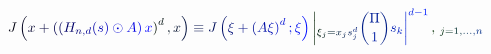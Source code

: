 \documentclass[12pt]{article}
\begin{document}
\makeatletter
\renewcommand*{\@textcolor}[3]{%
  \protect\leavevmode
  \begingroup
    \color#1{#2}#3%
  \endgroup
}
\makeatother
\begin{displaymath}
\mathcolor[RGB]{0,0,15}{J} \mathcolor[RGB]{0,0,30}{\left(} \mathcolor[RGB]{0,0,45}{x} \mathcolor[RGB]{0,0,60}{+} \mathcolor[RGB]{0,0,75}{\left(} \mathcolor[RGB]{0,0,90}{\left(} \mathcolor[RGB]{0,0,105}{H} _ { \mathcolor[RGB]{0,0,120}{n} \mathcolor[RGB]{0,0,135}{,} \mathcolor[RGB]{0,0,150}{d} } \mathcolor[RGB]{0,0,165}{(} \mathcolor[RGB]{0,0,180}{s} \mathcolor[RGB]{0,0,195}{)} \mathcolor[RGB]{0,0,210}{\odot} \mathcolor[RGB]{0,0,225}{A} \mathcolor[RGB]{0,0,240}{\right)} \mathcolor[RGB]{0,0,255}{x} \mathcolor[RGB]{0,15,0}{\right)} ^ { \mathcolor[RGB]{0,15,15}{d} } \mathcolor[RGB]{0,15,30}{,} \mathcolor[RGB]{0,15,45}{x} \mathcolor[RGB]{0,15,60}{\right)} \mathcolor[RGB]{0,15,75}{\equiv} \mathcolor[RGB]{0,15,90}{J} \mathcolor[RGB]{0,15,105}{\left(} \mathcolor[RGB]{0,15,120}{\xi} \mathcolor[RGB]{0,15,135}{+} \mathcolor[RGB]{0,15,150}{\left(} \mathcolor[RGB]{0,15,165}{A} \mathcolor[RGB]{0,15,180}{\xi} \mathcolor[RGB]{0,15,195}{\right)} ^ { \mathcolor[RGB]{0,15,210}{d} } \mathcolor[RGB]{0,15,225}{;} \mathcolor[RGB]{0,15,240}{\xi} \mathcolor[RGB]{0,15,255}{\right)} \mathcolor[RGB]{0,30,0}{\left\vert} _ { \mathcolor[RGB]{0,30,15}{\xi} _ { \mathcolor[RGB]{0,30,30}{j} } \mathcolor[RGB]{0,30,45}{=} \mathcolor[RGB]{0,30,60}{x} _ { \mathcolor[RGB]{0,30,75}{j} } \mathcolor[RGB]{0,30,90}{s} _ { \mathcolor[RGB]{0,30,105}{j} } ^ { \mathcolor[RGB]{0,30,120}{d} } } \mathcolor[RGB]{0,30,135}{\binom { \mathcolor[RGB]{0,30,150}{\Pi} } { \mathcolor[RGB]{0,30,165}{1} } } \mathcolor[RGB]{0,30,180}{s} _ { \mathcolor[RGB]{0,30,195}{k} } \mathcolor[RGB]{0,30,210}{\right\vert} ^ { \mathcolor[RGB]{0,30,225}{d} \mathcolor[RGB]{0,30,240}{-} \mathcolor[RGB]{0,30,255}{1} } \mathcolor[RGB]{0,45,0}{,} \, _ { \mathcolor[RGB]{0,45,15}{j} \mathcolor[RGB]{0,45,30}{=} \mathcolor[RGB]{0,45,45}{1} \mathcolor[RGB]{0,45,60}{,} \mathcolor[RGB]{0,45,75}{.} \mathcolor[RGB]{0,45,90}{.} \mathcolor[RGB]{0,45,105}{.} \mathcolor[RGB]{0,45,120}{,} \mathcolor[RGB]{0,45,135}{n} }
\end{displaymath}
\end{document}
